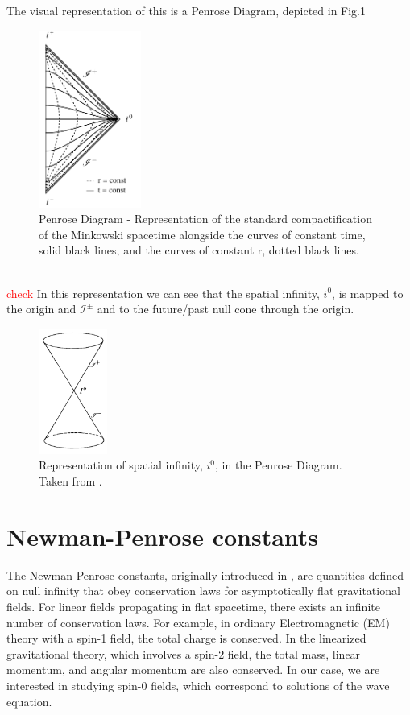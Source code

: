 The visual representation of this is a Penrose Diagram, depicted in Fig.1
\begin{figure}[h]
	\centering \includegraphics[width =0.3\textwidth]{Penrose diagram.pdf}
    \caption{Penrose Diagram - Representation of the standard
      compactification of the Minkowski spacetime alongside the curves of constant
      time, solid black lines, and the curves of constant r, dotted
      black lines.}
\end{figure}
\\
\textcolor{red}{check}
In this representation we can see that the spatial infinity, $i^0$, is mapped to the origin and $\mathscr{I}^{\pm}$ and to the future/past null cone through the origin.\\
\begin{figure}[h!]
	\centering \includegraphics[width =0.2\textwidth]{spatial infinity.jpeg}
    \caption{Representation of spatial infinity, $i^0$, in the Penrose Diagram.\\ Taken from \cite{Ste91}.}
\end{figure}
\section{Newman-Penrose constants}
\label{section:Newman-Penrose Constants}
The Newman-Penrose constants, originally introduced in \cite{NewPen68}, are quantities defined on null infinity that obey conservation laws for asymptotically flat gravitational fields. For linear fields propagating in flat spacetime, there exists an infinite number of conservation laws. For example, in ordinary Electromagnetic (EM) theory with a spin-1 field, the total charge is conserved. In the linearized gravitational theory, which involves a spin-2 field, the total mass, linear momentum, and angular momentum are also conserved. In our case, we are interested in studying spin-0 fields, which correspond to solutions of the wave equation.

